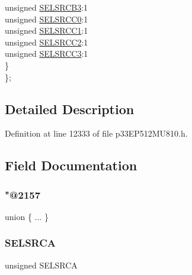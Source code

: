 \begin{DoxyCompactItemize}
\begin{tabbing}
\>\>unsigned \hyperlink{structtag_c_m1_m_s_k_s_r_c_b_i_t_s_add54534d44de4b82fdc84f84aa070f45}{SELSRCB3}:1\\
\>\>unsigned \hyperlink{structtag_c_m1_m_s_k_s_r_c_b_i_t_s_a695ed39b349ba556d685ef7fc3ab9f19}{SELSRCC0}:1\\
\>\>unsigned \hyperlink{structtag_c_m1_m_s_k_s_r_c_b_i_t_s_a5b873921176d73d0048f77a7230211c3}{SELSRCC1}:1\\
\>\>unsigned \hyperlink{structtag_c_m1_m_s_k_s_r_c_b_i_t_s_a7cf665e6530692c6a4905ad1e53934ad}{SELSRCC2}:1\\
\>\>unsigned \hyperlink{structtag_c_m1_m_s_k_s_r_c_b_i_t_s_a232ce18f72b62eef1f6ac40a0c4b7f31}{SELSRCC3}:1\\
\>\} \\
\}; \\

\end{tabbing}\end{DoxyCompactItemize}


\subsection{Detailed Description}


Definition at line 12333 of file p33\+E\+P512\+M\+U810.\+h.



\subsection{Field Documentation}
\mbox{\label{structtag_c_m1_m_s_k_s_r_c_b_i_t_s_a8e6cd97ba5065be576bda87bb627f254}} 
\subsubsection{\texorpdfstring{"@2157}{@2157}}
{\footnotesize\ttfamily union \{ ... \} }

\mbox{\label{structtag_c_m1_m_s_k_s_r_c_b_i_t_s_a71efbbcc07c5589abbdc8fbc64bb43b7}} 
\subsubsection{\texorpdfstring{S\+E\+L\+S\+R\+CA}{SELSRCA}}
{\footnotesize\ttfamily unsigned S\+E\+L\+S\+R\+CA}




